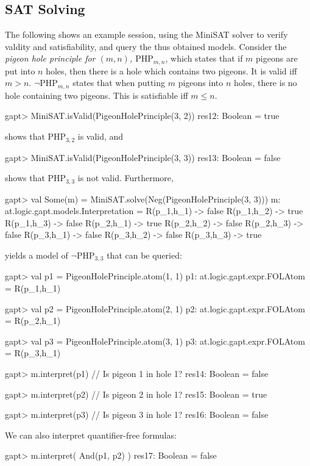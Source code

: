 \documentclass[a4paper,11pt]{article}
\begin{document}
\subsection{SAT Solving}
%
The following shows an example session, using the MiniSAT solver
to verify valdity and satisfiability, and query the thus obtained models.
Consider the {\em pigeon hole principle for $(m, n)$, $\mathrm{PHP}_{m,n}$}, which states that if $m$ pigeons
are put into $n$ holes, then there is a hole which contains two pigeons. It is valid
iff $m>n$. $\neg\mathrm{PHP}_{m,n}$ states that when putting $m$ pigeons into $n$ holes, there
is no hole containing two pigeons. This is satisfiable iff $m\leq n$.
\begin{clilisting}
gapt> MiniSAT.isValid(PigeonHolePrinciple(3, 2))
res12: Boolean = true

\end{clilisting}
shows that $\mathrm{PHP}_{3,2}$ is valid, and
\begin{clilisting}
gapt> MiniSAT.isValid(PigeonHolePrinciple(3, 3))
res13: Boolean = false

\end{clilisting}
shows that $\mathrm{PHP}_{3,3}$ is not valid.
Furthermore,
\begin{clilisting}
gapt> val Some(m) = MiniSAT.solve(Neg(PigeonHolePrinciple(3, 3)))
m: at.logic.gapt.models.Interpretation =
R(p_1,h_1) -> false
R(p_1,h_2) -> true
R(p_1,h_3) -> false
R(p_2,h_1) -> true
R(p_2,h_2) -> false
R(p_2,h_3) -> false
R(p_3,h_1) -> false
R(p_3,h_2) -> false
R(p_3,h_3) -> true

\end{clilisting}
yields a model of $\neg\mathrm{PHP}_{3,3}$ that can be queried:
\begin{clilisting}
gapt> val p1 = PigeonHolePrinciple.atom(1, 1)
p1: at.logic.gapt.expr.FOLAtom = R(p_1,h_1)

gapt> val p2 = PigeonHolePrinciple.atom(2, 1)
p2: at.logic.gapt.expr.FOLAtom = R(p_2,h_1)

gapt> val p3 = PigeonHolePrinciple.atom(3, 1)
p3: at.logic.gapt.expr.FOLAtom = R(p_3,h_1)

gapt> m.interpret(p1) // Is pigeon 1 in hole 1?
res14: Boolean = false

gapt> m.interpret(p2) // Is pigeon 2 in hole 1?
res15: Boolean = true

gapt> m.interpret(p3) // Is pigeon 3 in hole 1?
res16: Boolean = false

\end{clilisting}
We can also interpret quantifier-free formulas:
\begin{clilisting}
gapt> m.interpret( And(p1, p2) )
res17: Boolean = false

\end{clilisting}
\end{document}
